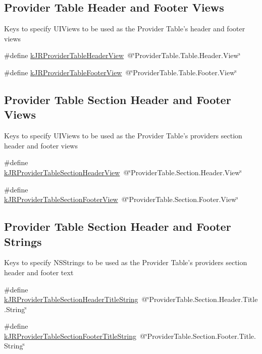 \subsection*{Provider Table Header and Footer Views}
\label{_amgrp7070181e423f8bdc938527d6916a62cf}
 Keys to specify UIViews to be used as the Provider Table's header and footer views \begin{DoxyCompactItemize}
\item 
\#define \hyperlink{group__custom_interface_ga1a0f39bfdb880fdd0b8b39cbec492b6f}{kJRProviderTableHeaderView}~@\char`\"{}ProviderTable.Table.Header.View\char`\"{}
\item 
\#define \hyperlink{group__custom_interface_ga2b5c9162dd7701a552147ae1607a3b4d}{kJRProviderTableFooterView}~@\char`\"{}ProviderTable.Table.Footer.View\char`\"{}
\end{DoxyCompactItemize}
\subsection*{Provider Table Section Header and Footer Views}
\label{_amgrp0087c3b750e6b14cf3b110df546a77d4}
 \label{group__custom_interface_tableSectionViews}
\hypertarget{group__custom_interface_tableSectionViews}{}


Keys to specify UIViews to be used as the Provider Table's providers section header and footer views \begin{DoxyCompactItemize}
\item 
\#define \hyperlink{group__custom_interface_gaaff8ebdd2b9badb1d0a019a71d47db46}{kJRProviderTableSectionHeaderView}~@\char`\"{}ProviderTable.Section.Header.View\char`\"{}
\item 
\#define \hyperlink{group__custom_interface_ga984c096e9258dea402a1c27ae8bb6c8f}{kJRProviderTableSectionFooterView}~@\char`\"{}ProviderTable.Section.Footer.View\char`\"{}
\end{DoxyCompactItemize}
\subsection*{Provider Table Section Header and Footer Strings}
\label{_amgrp04b2524ada266b7d80839ac3b6e6ae59}
 \label{group__custom_interface_tableSectionStrings}
\hypertarget{group__custom_interface_tableSectionStrings}{}


Keys to specify NSStrings to be used as the Provider Table's providers section header and footer text \begin{DoxyCompactItemize}
\item 
\#define \hyperlink{group__custom_interface_ga667a6c955993ec24292875f319a7d763}{kJRProviderTableSectionHeaderTitleString}~@\char`\"{}ProviderTable.Section.Header.Title.String\char`\"{}
\item 
\#define \hyperlink{group__custom_interface_ga72e63105251e7d4d6a363e279c2bf775}{kJRProviderTableSectionFooterTitleString}~@\char`\"{}ProviderTable.Section.Footer.Title.String\char`\"{}
\end{DoxyCompactItemize}


